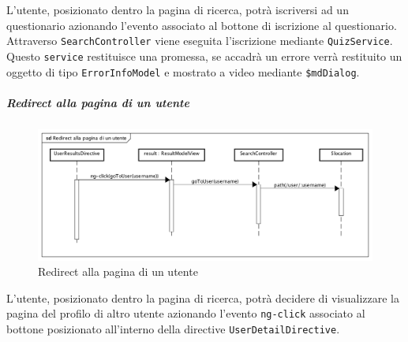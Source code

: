 L'utente, posizionato dentro la pagina di ricerca, potrà iscriversi ad un questionario azionando l'evento associato al bottone di iscrizione al questionario. Attraverso \texttt{SearchController} viene eseguita l'iscrizione mediante \texttt{QuizService}. Questo \texttt{service} restituisce una promessa, se accadrà un errore verrà restituito un oggetto di tipo \texttt{ErrorInfoModel} e mostrato a video mediante \texttt{\$mdDialog}.


\subparagraph{Redirect alla pagina di un utente}

\label{Redirect alla pagina di un utente}

\begin{figure}[ht]
	\centering
	\includegraphics[scale=0.5,keepaspectratio]{UML/DiagrammiDiSequenza/Front-end/Search_goToUser.png}
	\caption{Redirect alla pagina di un utente}
\end{figure} \FloatBarrier

L'utente, posizionato dentro la pagina di ricerca, potrà decidere di visualizzare la pagina del profilo di altro utente azionando l'evento \texttt{ng-click} associato al bottone posizionato all'interno della directive \texttt{UserDetailDirective}.